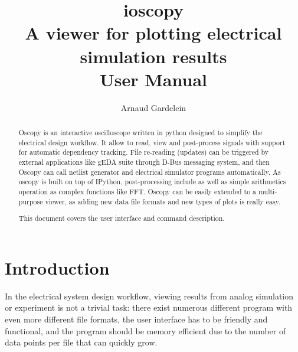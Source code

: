 \documentclass[a4paper,11pt]{report}
\title{{\sc ioscopy}\\A viewer for plotting electrical simulation results\\User Manual}
\author{Arnaud Gardelein}
\begin{document}
\sf
\maketitle
\begin{abstract}

Oscopy is an interactive oscilloscope written in python designed to simplify the electrical design workflow.
It allow to read, view and post-process signals with support for automatic dependency tracking.
File re-reading (updates) can be triggered by external applications like gEDA suite through D-Bus messaging system, and then Oscopy can call netlist generator and electrical simulator programs automatically.
As oscopy is built on top of IPython, post-processing include as well as simple arithmetics operation as complex functions like FFT.
Oscopy can be easily extended to a multi-purpose viewer, as adding new data file formats and new types of plots is really easy.


This document covers the user interface and command description.
\end{abstract}

\pagestyle{fancy}
\lhead{}
\cfoot{}
\rhead{\textsf{\leftmark}}
\rfoot{\textsf\thepage}
\chapter{Introduction}
\label{sec:intro}
In the electrical system design workflow, viewing results from analog simulation or experi\-ment is not a trivial task: there exist numerous different program with even more different file formats, the user interface has to be friendly and functional, and the program should be memory efficient due to the number of data points per file that can quickly grow.
\end{document}
